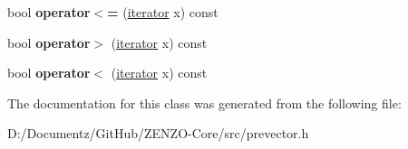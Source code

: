 \begin{DoxyCompactItemize}
bool {\bfseries operator$<$=} (\mbox{\hyperlink{classprevector_1_1iterator}{iterator}} x) const
\item 
\mbox{\label{classprevector_1_1iterator_abf1cd6daede5b7f4fbe6e78f409754c1}} 
bool {\bfseries operator$>$} (\mbox{\hyperlink{classprevector_1_1iterator}{iterator}} x) const
\item 
\mbox{\label{classprevector_1_1iterator_a21c9ead8f23f691204d0e1b58c8de636}} 
bool {\bfseries operator$<$} (\mbox{\hyperlink{classprevector_1_1iterator}{iterator}} x) const
\end{DoxyCompactItemize}


The documentation for this class was generated from the following file\+:\begin{DoxyCompactItemize}
\item 
D\+:/\+Documentz/\+Git\+Hub/\+Z\+E\+N\+Z\+O-\/\+Core/src/prevector.\+h\end{DoxyCompactItemize}
